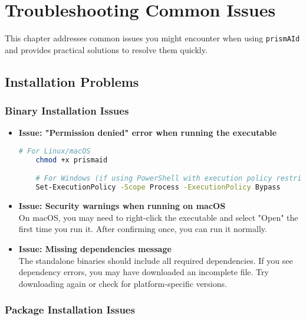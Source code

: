 \chapter{Troubleshooting Common Issues} \label{chap:troubleshooting}

This chapter addresses common issues you might encounter when using \texttt{prismAId} and provides practical solutions to resolve them quickly.

\section{Installation Problems}

\subsection{Binary Installation Issues}

\begin{itemize}
    \item \textbf{Issue: "Permission denied" error when running the executable}

    \begin{commandbox}
    \begin{lstlisting}[language=Bash]
    # For Linux/macOS
    chmod +x prismaid

    # For Windows (if using PowerShell with execution policy restrictions)
    Set-ExecutionPolicy -Scope Process -ExecutionPolicy Bypass
    \end{lstlisting}
    \end{commandbox}

    \item \textbf{Issue: Security warnings when running on macOS}
    \\
    On macOS, you may need to right-click the executable and select "Open" the first time you run it. After confirming once, you can run it normally.

    \item \textbf{Issue: Missing dependencies message}
    \\
    The standalone binaries should include all required dependencies. If you see dependency errors, you may have downloaded an incomplete file. Try downloading again or check for platform-specific versions.
\end{itemize}

\subsection{Package Installation Issues}

